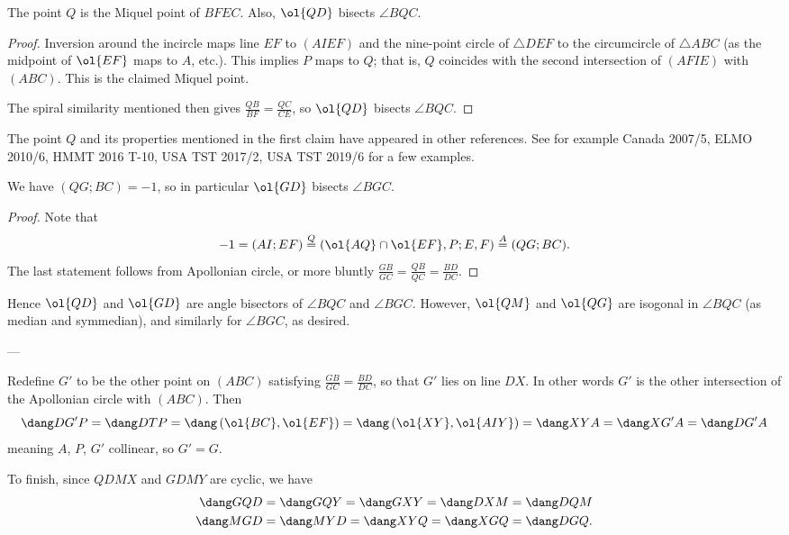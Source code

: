 \begin{claim*}
  The point $Q$ is the Miquel point of $BFEC$.
  Also, $\ol{QD}$ bisects $\angle BQC$.
\end{claim*}
\begin{proof}
  Inversion around the incircle maps line $EF$ to $(AIEF)$
  and the nine-point circle of $\triangle DEF$
  to the circumcircle of $\triangle ABC$
  (as the midpoint of $\ol{EF}$ maps to $A$, etc.).
  This implies $P$ maps to $Q$; that is, $Q$ coincides with
  the second intersection of $(AFIE)$ with $(ABC)$.
  This is the claimed Miquel point.

  The spiral similarity mentioned then gives
  $\frac{QB}{BF} = \frac{QC}{CE}$, so $\ol{QD}$ bisects $\angle BQC$.
\end{proof}

\begin{remark*}
  The point $Q$ and its properties mentioned in the first claim
  have appeared in other references.
  See for example Canada 2007/5, ELMO 2010/6,
  HMMT 2016 T-10, USA TST 2017/2, USA TST 2019/6 for a few examples.
\end{remark*}

\begin{claim*}
  We have $(QG;BC) = -1$, so in particular $\ol{GD}$ bisects $\angle BGC$.
\end{claim*}
\begin{proof}
  Note that
  \[ -1 = (AI;EF) \overset{Q}{=} (\ol{AQ} \cap \ol{EF}, P; E, F)
    \overset{A}{=} (QG;BC). \]
  The last statement follows from Apollonian circle,
  or more bluntly $\frac{GB}{GC} = \frac{QB}{QC} = \frac{BD}{DC}$.
\end{proof}

Hence $\ol{QD}$ and $\ol{GD}$ are angle bisectors of $\angle BQC$ and $\angle BGC$.
However, $\ol{QM}$ and $\ol{QG}$ are isogonal in $\angle BQC$
(as median and symmedian), and similarly for $\angle BGC$, as desired.

---

\begin{remark*}
  Redefine $G'$ to be the other point on $(ABC)$
  satisfying $\frac{GB}{GC} = \frac{BD}{DC}$,
  so that $G'$ lies on line $DX$.
  In other words $G'$ is the other intersection
  of the Apollonian circle with $(ABC)$.
  Then \[ \dang DG'P = \dang DTP
    = \dang \left( \ol{BC}, \ol{EF} \right)
    = \dang \left( \ol{XY}, \ol{AIY} \right)
    = \dang XYA = \dang XG'A = \dang DG'A \]
  meaning $A$, $P$, $G'$ collinear, so $G' = G$.
\end{remark*}

To finish, since $QDMX$ and $GDMY$ are cyclic, we have
\begin{align*}
  \dang GQD &= \dang GQY = \dang GXY = \dang DXM = \dang DQM \\
  \dang MGD &= \dang MYD = \dang XYQ = \dang XGQ = \dang DGQ.
\end{align*}

